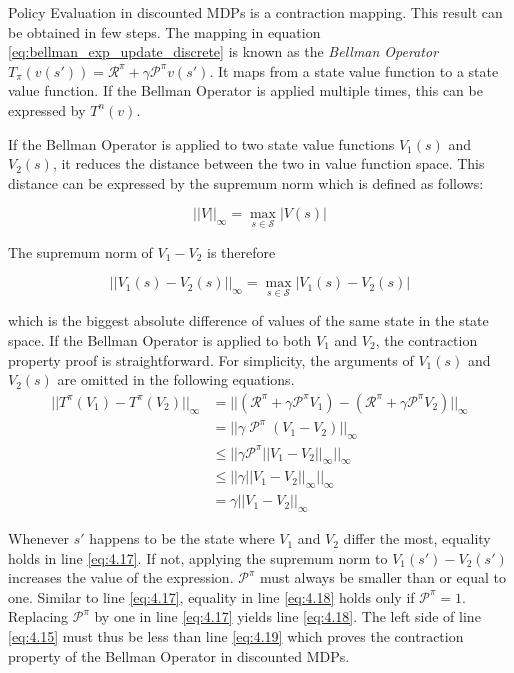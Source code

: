 Policy Evaluation in discounted MDPs is a contraction mapping. This result can be obtained in few steps. The mapping in equation \ref{eq:bellman_exp_update_discrete} is known as the \textit{Bellman Operator} $T_\pi(v(s'))=\mathcal{R}^\pi+\gamma \mathcal{P}^\pi v(s')$. It maps from a state value function to a state value function. If the Bellman Operator is applied multiple times, this can be expressed by $T^n(v)$.

If the Bellman Operator is applied to two state value functions $V_1(s)$ and $V_2(s)$, it reduces the distance between the two in value function space. This distance can be expressed by the supremum norm which is defined as follows:

\begin{equation}
||V||_\infty = \max_{s \in \mathcal{S}} |V(s)|
\end{equation}

The supremum norm of $V_1 - V_2$ is therefore

\begin{equation}
||V_1(s) - V_2(s)||_\infty = \max_{s \in \mathcal{S}} |V_1(s)-V_2(s)|
\end{equation}

which is the biggest absolute difference of values of the same state in the state space. If the Bellman Operator is applied to both $V_1$ and $V_2$, the contraction property proof is straightforward. For simplicity, the arguments of $V_1(s)$ and $V_2(s)$ are omitted in the following equations.
\begin{align}
||T^\pi(V_1)-T^\pi(V_2)||_\infty &= ||(\mathcal{R}^\pi+\gamma \mathcal{P}^\pi V_1)-(\mathcal{R}^\pi+\gamma \mathcal{P}^\pi V_2)||_\infty \label{eq:4.15}\\
&=||\gamma\; \mathcal{P}^\pi\;(V_1 - V_2)||_\infty \label{eq:4.16}\\
&\leq ||\gamma \mathcal{P}^\pi ||V_1 - V_2||_\infty ||_\infty \label{eq:4.17} \\
&\leq ||\gamma ||V_1 - V_2||_\infty ||_\infty \label{eq:4.18}\\
&=\gamma ||V_1 - V_2||_\infty \label{eq:4.19}
\end{align} 

Whenever $s'$ happens to be the state where $V_1$ and $V_2$ differ the most, equality holds in line \ref{eq:4.17}. If not, applying the supremum norm to $V_1(s')-V_2(s')$ increases the value of the expression. $\mathcal{P}^\pi$ must always be smaller than or equal to one. Similar to line \ref{eq:4.17}, equality in line \ref{eq:4.18} holds only if $\mathcal{P}^\pi=1$. Replacing $\mathcal{P}^\pi$ by one in line \ref{eq:4.17} yields line \ref{eq:4.18}. The left side of line \ref{eq:4.15} must thus be less than line \ref{eq:4.19} which proves the contraction property of the Bellman Operator in discounted MDPs.

